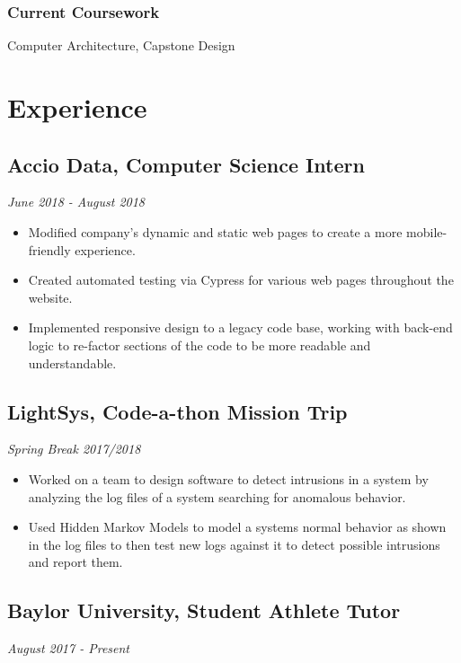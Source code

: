 \documentclass{article}
\begin{document}
\subsubsection{Current Coursework}
Computer Architecture, Capstone Design

\section{Experience}

\subsection{Accio Data, Computer Science Intern}
\hfill\textit{June 2018 - August 2018}

\begin{itemize}
	\itemsep0em
	\item Modified company's dynamic and static web pages to create a more
	mobile-friendly experience.
	
	\item Created automated testing via Cypress for various web pages
	throughout the website.
	
	\item Implemented responsive design to a legacy code base, working with
	back-end logic to re-factor sections of the code to be more
	readable and understandable.  
\end{itemize}

\subsection{LightSys, Code-a-thon Mission Trip}
\hfill
\textit{Spring Break 2017/2018}

\begin{itemize}
	\itemsep0em
	\item Worked on a team to design software to detect intrusions in a system by analyzing the log files of a system searching for anomalous behavior.
	
	\item Used Hidden Markov Models to model a systems normal behavior as shown in the log files to then test new logs against it to detect possible intrusions and report them.
\end{itemize}

\subsection{Baylor University, Student Athlete Tutor} 
\hfill\textit{August 2017 - Present}
\end{document}
